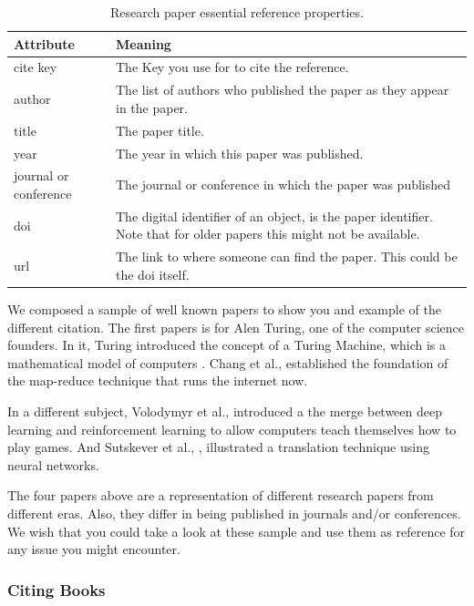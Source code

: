 \begin{table}[H]
    \centering
    \begin{tabular}{p{}p{}}
        \hline\hline
        Attribute      & Meaning \\ \hline\hline
        cite key  & The Key you use for to cite the reference.  \\
        author    & The list of authors who published the paper as they appear in the paper.  \\
        title & The paper title.  \\
        year & The year in which this paper was published.  \\
        journal or conference & The journal or conference in which the paper was published \\
        doi & The digital identifier of an object, is the paper identifier. Note that for older papers this might not be available. \\
        url & The link to where someone can find the paper. This could be the doi itself. \\ \hline
    \end{tabular}
    \caption{Research paper essential reference properties.}
    \label{tab:rp-properties}
\end{table}

We composed a sample of well known papers to show you and example of the different citation. The first papers is for Alen Turing, one of the computer science founders. In it, Turing introduced the concept of a Turing Machine, which is a mathematical model of computers \cite{Turing:Computable:36}. Chang et al., \cite{Chang:Bigtable:08} established the foundation of the map-reduce technique that runs the internet now. 

In a different subject, Volodymyr et al., \cite{Mnih:AtariRL:13} introduced a the merge between deep learning and reinforcement learning to allow computers teach themselves how to play games. And Sutskever et al., \cite{Sutskever:SeqToSeq:14}, illustrated a translation technique using neural networks.

The four papers above are a representation of different research papers from different eras. Also, they differ in being published in journals and/or conferences. We wish that you could take a look at these sample and use them as reference for any issue you might encounter. 

\subsubsection{Citing Books}

